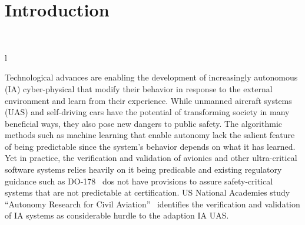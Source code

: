 \section{Introduction}~\label{sec:intro} 

l%


Technological advances are enabling the development of increasingly
autonomous (IA) cyber-physical that modify their behavior in response
to the external environment and learn from their experience.  While
unmanned aircraft systems (UAS) and self-driving cars have the
potential of transforming society in many beneficial ways, they also
pose new dangers to public safety.  The algorithmic methods such as
machine learning that enable autonomy lack the salient feature of
being predictable since the system's behavior depends on what it has
learned.  Yet in practice, the verification and validation of avionics
and other ultra-critical software systems relies heavily on it being
predicable and existing regulatory guidance  such as
DO-178~\cite{DO178B}  dos not  have provisions to
assure safety-critical systems that are not predictable at certification. 
US National Academies study ``Autonomy
Research for Civil Aviation''~\cite{NRC14} identifies the verification
and validation of IA systems as considerable hurdle to the adaption IA
UAS.  




